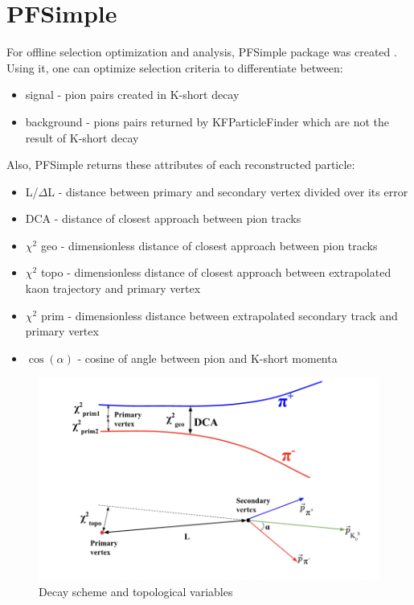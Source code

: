 \documentclass[12pt,a4paper]{report}
\begin{document}
\section{PFSimple}
For offline selection optimization and analysis, PFSimple package was created \cite{pfsimple}. Using it, one can optimize selection criteria to differentiate between:
\begin{itemize}
    \item signal - pion pairs created in K-short decay
    \item background - pions pairs returned by KFParticleFinder which are not the result of K-short decay
\end{itemize}
Also, PFSimple returns these attributes of each reconstructed particle:
\begin{itemize}
    \item L/$\Delta$L - distance between primary and secondary vertex divided over its error
    \item DCA - distance of closest approach between pion tracks
    \item $\chi^2$ geo - dimensionless distance of closest approach between pion tracks
    \item $\chi^2$ topo - dimensionless distance of closest approach between extrapolated kaon trajectory and primary vertex
    \item $\chi^2$ prim - dimensionless distance between extrapolated secondary track and primary vertex
    \item $\cos(\alpha)$ - cosine of angle between pion and K-short momenta
\end{itemize}
\begin{figure}[H]
    \centering
    \includegraphics[width=.9\textwidth]{images/pfsimple_variables.png}
    \caption{Decay scheme and topological variables}
    \label{cbm_setup}
\end{figure}
\end{document}
